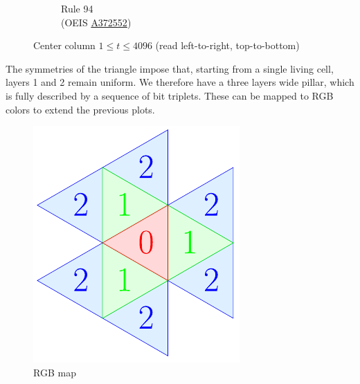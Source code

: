 \documentclass{article}
\begin{document}
\begin{figure}[H]
\begin{subfigure}[b]{0.24\textwidth}
        \caption*{Rule 94\\(OEIS \href{https://oeis.org/A372552}{A372552})}
        \label{fig:rule-94-center_column_plot-4096}
    \end{subfigure}
       \caption{Center column $1\leq t \leq 4096$ (read left-to-right, top-to-bottom)}
       \label{fig:center-column}
\end{figure}

The symmetries of the triangle impose that, starting from a single living cell, layers 1 and 2 remain uniform. We therefore have a three layers wide pillar, which is fully described by a sequence of bit triplets. These can be mapped to RGB colors to extend the previous plots.

\vspace{-8pt}

\begin{figure}[H]
    \centering
    \includegraphics[width=.2\textwidth]{graphics/behavior/center-columns/rgb-map.pdf}
    \caption{RGB map}
    \label{fig:rgb-map}
\end{figure}
\end{document}
